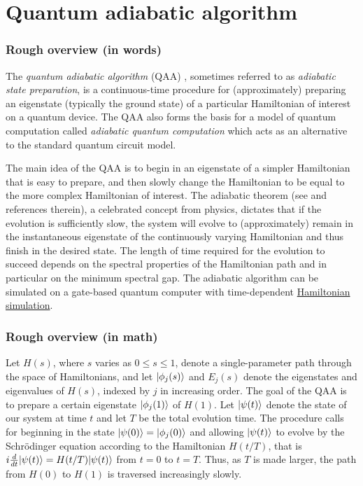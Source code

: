 
\section{Quantum adiabatic algorithm}\label{prim:QuantumAdiabaticAlgorithm}
\begin{refsection}

\subsubsection*{Rough overview (in words)}

The \emph{quantum adiabatic algorithm} (QAA) \cite{farhi2000QCompAdiabatic}, sometimes referred to as \emph{adiabatic state preparation}, is a continuous-time procedure for (approximately) preparing an eigenstate (typically the ground state) of a particular Hamiltonian of interest on a quantum device. The QAA also forms the basis for a model of quantum computation called \emph{adiabatic quantum computation} which acts as an alternative to the standard quantum circuit model. 

The main idea of the QAA is to begin in an eigenstate of a simpler Hamiltonian that is easy to prepare, and then slowly change the Hamiltonian to be equal to the more complex Hamiltonian of interest. The adiabatic theorem (see \cite{albash2018AQCreview} and references therein), a celebrated concept from physics, dictates that if the evolution is sufficiently slow, the system will evolve to (approximately) remain in the instantaneous eigenstate of the continuously varying Hamiltonian and thus finish in the desired state. 
The length of time required for the evolution to succeed depends on the spectral properties of the Hamiltonian path and in particular on the minimum spectral gap. The adiabatic algorithm can be simulated on a gate-based quantum computer with time-dependent \hyperref[prim:HamiltonianSimulation]{Hamiltonian simulation}.


\subsubsection*{Rough overview (in math)}

Let $H(s)$, where $s$ varies as $0 \leq s \leq 1$, denote a single-parameter path through the space of Hamiltonians, and let $\lvert\phi_j(s)\rangle$ and $E_j(s)$ denote the eigenstates and eigenvalues of $H(s)$, indexed by $j$ in increasing order. 
The goal of the QAA is to prepare a certain eigenstate $\lvert\phi_j(1)\rangle$ of $H(1)$. Let $\lvert\psi(t)\rangle$ denote the state of our system at time $t$ and let $T$ be the total evolution time. The procedure calls for beginning in the state $\lvert\psi(0)\rangle = \lvert\phi_j(0)\rangle$ and allowing $\lvert\psi(t)\rangle$ to evolve by the Schr\"odinger equation according to the Hamiltonian $H(t/T)$, that is $i\frac{d}{dt}\lvert\psi(t)\rangle = H(t/T)\lvert\psi(t)\rangle$ from $t=0$ to $t=T$. Thus, as $T$ is made larger, the path from $H(0)$ to $H(1)$ is traversed increasingly slowly. 



\end{refsection}
